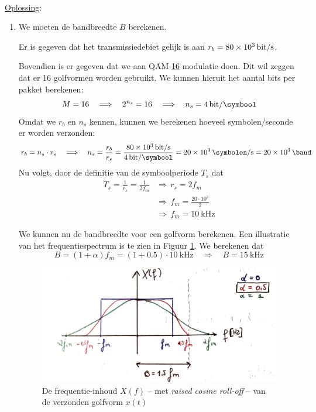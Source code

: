 \documentclass[kulak]{kulakarticle}
\begin{document}
	\hfill \\
	\underline{Oplossing}:
	\begin{enumerate}

		\item We moeten de bandbreedte \(B\) berekenen.

		Er is gegeven dat het transmissiedebiet gelijk is aan \(r_b = \SI{80e3}{\bit/\second}\).

		Bovendien is er gegeven dat we aan QAM-\underline{16} modulatie doen. Dit wil zeggen dat er 16 golfvormen worden gebruikt. We kunnen hieruit het aantal bits per pakket berekenen: \begin{equation*}
			M=16 \quad \Longrightarrow \quad 2^{n_s} =16 \quad \Longrightarrow \quad n_s = \SI{4}{\bit/\symbool}
		\end{equation*} Omdat we \(r_b\) en \(n_s\) kennen, kunnen we berekenen hoeveel symbolen/seconde er worden verzonden: \begin{equation*}
			r_b = n_s \cdot r_s \quad \Longrightarrow \quad n_s = \frac{r_b}{r_s} = \frac{\SI{80e3}{\bit/\second}}{\SI{4}{\bit/\symbool}} = \SI{20e3}{\symbolen/\second} = \SI{20e3}{\baud}
		\end{equation*} Nu volgt, door de definitie van de symboolperiode \(T_s\) dat \begin{align*}
		T_s = \frac{1}{r_s} = \frac{1}{2f_m} & \Rightarrow \, r_s = 2f_m\\
		&\Rightarrow \,  f_m = \frac{20 \cdot 10^3}{2}\\
		&\Rightarrow \, f_m = \SI{10}{\kilo\hertz}
		\end{align*}

		We kunnen nu de bandbreedte voor een golfvorm berekenen. Een illustratie van het frequentiespectrum is te zien in Figuur \ref{fig:raised_cosine}. We berekenen dat \[B = (1+\alpha)f_m = (1+0.5) \cdot \SI{10}{\kilo\hertz} \quad \Longrightarrow \quad \boxed{B = \SI{15}{\kilo\hertz}}\]

		\begin{figure}[h!]
			\centering
			\includegraphics[width=.4\textwidth]{raised_cosine}
			\caption{De frequentie-inhoud \(X(f)\) -- met \textit{raised cosine roll-off} -- van de verzonden golfvorm \(x(t)\)}
			\label{fig:raised_cosine}
		\end{figure}


\end{enumerate}
\end{document}
